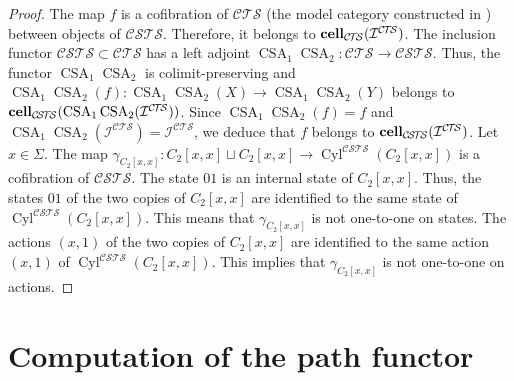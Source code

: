 \documentclass[a4paper,12pt]{amsart}
\begin{document}
\begin{proof} The map $f$ is a cofibration of ${\mathcal{C\!T\!S}}$ (the model category
constructed in \cite{biscsts1}) between objects of ${\mathcal{C\!S\!T\!S}}$. Therefore,
it belongs to $\operatorname{{{\rm{\mathbf{{cell}}}}}}_{\mathcal{C\!T\!S}}({\mathcal{I}}^{\mathcal{C\!T\!S}})$. The inclusion functor ${\mathcal{C\!S\!T\!S}}
\subset {\mathcal{C\!T\!S}}$ has a left adjoint $\operatorname{CSA}_1\operatorname{CSA}_2:{\mathcal{C\!T\!S}} \to
{\mathcal{C\!S\!T\!S}}$. Thus, the functor $\operatorname{CSA}_1\operatorname{CSA}_2$ is colimit-preserving and
$\operatorname{CSA}_1\operatorname{CSA}_2(f):\operatorname{CSA}_1\operatorname{CSA}_2(X) \to \operatorname{CSA}_1\operatorname{CSA}_2(Y)$ belongs to
$\operatorname{{{\rm{\mathbf{{cell}}}}}}_{\mathcal{C\!S\!T\!S}}(\operatorname{CSA}_1\operatorname{CSA}_2({\mathcal{I}}^{\mathcal{C\!T\!S}}))$. Since $\operatorname{CSA}_1\operatorname{CSA}_2(f)=f$ and
$\operatorname{CSA}_1\operatorname{CSA}_2({\mathcal{I}}^{\mathcal{C\!T\!S}}) = {\mathcal{I}}^{\mathcal{C\!T\!S}}$, we deduce that $f$ belongs to
$\operatorname{{{\rm{\mathbf{{cell}}}}}}_{\mathcal{C\!S\!T\!S}}({\mathcal{I}}^{\mathcal{C\!T\!S}})$.  Let $x\in \Sigma$. The map
$\gamma_{C_2[x,x]} : C_2[x,x] \sqcup C_2[x,x] \to
\operatorname{{Cyl}}^{\mathcal{C\!S\!T\!S}}(C_2[x,x])$ is a cofibration of ${\mathcal{C\!S\!T\!S}}$. The state $01$ is
an internal state of $C_2[x,x]$. Thus, the states $01$ of the two
copies of $C_2[x,x]$ are identified to the same state of
$\operatorname{{Cyl}}^{\mathcal{C\!S\!T\!S}}(C_2[x,x])$. This means that $\gamma_{C_2[x,x]}$ is not
one-to-one on states. The actions $(x,1)$ of the two copies of
$C_2[x,x]$ are identified to the same action $(x,1)$ of
$\operatorname{{Cyl}}^{\mathcal{C\!S\!T\!S}}(C_2[x,x])$. This implies that $\gamma_{C_2[x,x]}$ is not
one-to-one on actions.  \end{proof}

\section{Computation of the path functor}
\label{section-path-calcul}
\end{document}
